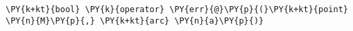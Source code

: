 \begin{Verbatim}[commandchars=\\\{\}]
    \PY{k+kt}{bool} \PY{k}{operator} \PY{err}{@}\PY{p}{(}\PY{k+kt}{point} \PY{n}{M}\PY{p}{,} \PY{k+kt}{arc} \PY{n}{a}\PY{p}{)}
\end{Verbatim}

